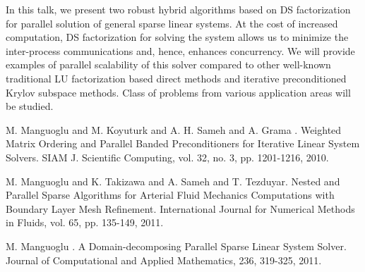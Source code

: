 In this talk, we present two robust hybrid algorithms based on DS factorization for parallel solution of general sparse linear systems. At the cost of increased computation, DS factorization for solving the system allows us to minimize the inter-process communications and, hence, enhances concurrency.  We will provide examples of parallel scalability of this solver compared to other well-known traditional LU factorization based direct methods and iterative preconditioned Krylov subspace methods. Class of problems from various application areas will be studied. 





\begin{thebibliography}{10}

{\sc M. Manguoglu and M. Koyuturk and A. H. Sameh and A. Grama }. {Weighted Matrix Ordering and Parallel Banded Preconditioners for Iterative Linear System Solvers}. SIAM J. Scientific Computing, vol. 32, no. 3, pp. 1201-1216, 2010.



{\sc M. Manguoglu and K. Takizawa and A. Sameh and T. Tezduyar}. {Nested and Parallel Sparse Algorithms for Arterial Fluid Mechanics Computations with Boundary Layer Mesh Refinement}. International Journal for Numerical Methods in Fluids, vol. 65, pp. 135-149, 2011.



{\sc M. Manguoglu }. {A Domain-decomposing Parallel Sparse Linear System Solver}. Journal of Computational and Applied Mathematics, 236, 319-325, 2011.

\end{thebibliography}
